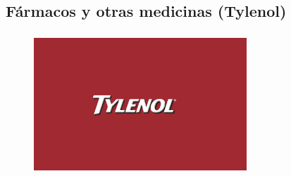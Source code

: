 \documentclass[compress, aspectratio=169]{beamer} %
\begin{document}
	\subsection{Fármacos y otras medicinas (Tylenol)}
		\begin{frame}
	\transdissolve[duration=1]

			\frametitle{\insertsubsection}
			
			\begin{figure}
			   \center\includegraphics[width=8cm]{tylenol.jpeg}			
			\end{figure}
			
			
		\end{frame}
	
\end{document}
